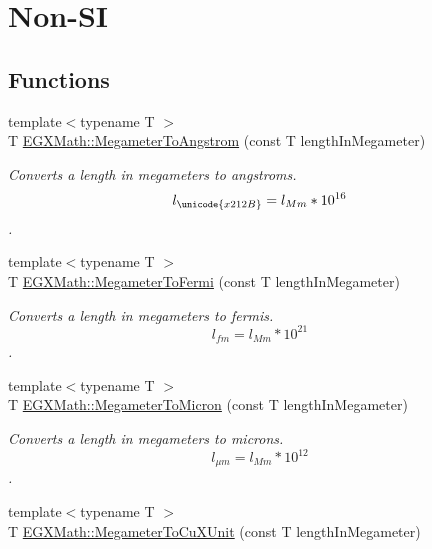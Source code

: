 \hypertarget{group___e_g_x_math-_conversions-_length_conversions-_megameter-_non-_s_i}{}\section{Non-\/\+SI}
\label{group___e_g_x_math-_conversions-_length_conversions-_megameter-_non-_s_i}
\subsection*{Functions}
\begin{DoxyCompactItemize}
\item 
{\footnotesize template$<$typename T $>$ }\\T \mbox{\hyperlink{group___e_g_x_math-_conversions-_length_conversions-_megameter-_non-_s_i_gac4c7e615f4ec3d000ac341a5bf9a79a0}{E\+G\+X\+Math\+::\+Megameter\+To\+Angstrom}} (const T length\+In\+Megameter)
\begin{DoxyCompactList}\small\item\em Converts a length in megameters to angstroms. \[ l_{\unicode{x212B}}=l_{Mm} * 10^{16} \]. \end{DoxyCompactList}\item 
{\footnotesize template$<$typename T $>$ }\\T \mbox{\hyperlink{group___e_g_x_math-_conversions-_length_conversions-_megameter-_non-_s_i_ga74f07a7c24ffe784415fb3d33a3b5bec}{E\+G\+X\+Math\+::\+Megameter\+To\+Fermi}} (const T length\+In\+Megameter)
\begin{DoxyCompactList}\small\item\em Converts a length in megameters to fermis. \[ l_{fm}=l_{Mm} * 10^{21} \]. \end{DoxyCompactList}\item 
{\footnotesize template$<$typename T $>$ }\\T \mbox{\hyperlink{group___e_g_x_math-_conversions-_length_conversions-_megameter-_non-_s_i_ga14e6b356b28257b1bde9cb9ebf6bc3c6}{E\+G\+X\+Math\+::\+Megameter\+To\+Micron}} (const T length\+In\+Megameter)
\begin{DoxyCompactList}\small\item\em Converts a length in megameters to microns. \[ l_{\mu m}=l_{Mm} * 10^{12} \]. \end{DoxyCompactList}\item 
{\footnotesize template$<$typename T $>$ }\\T \mbox{\hyperlink{group___e_g_x_math-_conversions-_length_conversions-_megameter-_non-_s_i_gae44ce2fd3e740a5aec1546ed10c83447}{E\+G\+X\+Math\+::\+Megameter\+To\+Cu\+X\+Unit}} (const T length\+In\+Megameter)

\end{DoxyCompactItemize}
